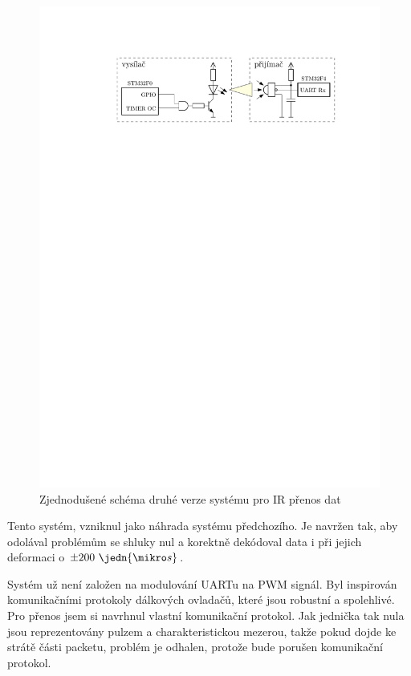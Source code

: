 \begin{figure}[H]
    \begin{center}
        \includegraphics[width=\textwidth]{img/ir-system}
    \end{center}
    \caption{Zjednodušené schéma druhé verze systému pro IR přenos dat}
\end{figure}

Tento systém, vzniknul jako náhrada systému předchozího. Je navržen tak, aby odolával problémům se shluky nul a korektně dekódoval data i při jejich deformaci o $\pm200~\jedn{\mikro s}$.

Systém už není založen na modulování UARTu na PWM signál. Byl inspirován komunikačními protokoly dálkových ovladačů, které jsou robustní a spolehlivé. Pro přenos jsem si navrhnul vlastní komunikační protokol. Jak jednička tak nula jsou reprezentovány pulzem a charakteristickou mezerou, takže pokud dojde ke strátě části packetu, problém je odhalen, protože bude porušen komunikační protokol.

